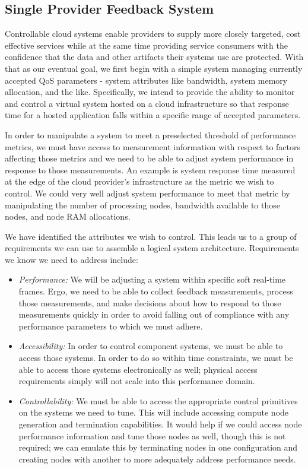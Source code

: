 \documentclass[notitlepage]{book}
\begin{document}
\begin{doublespace}
\subsection{Single Provider Feedback System}\label{sec:single}
Controllable cloud systems enable providers to supply more closely targeted, cost effective services while at the same time providing service consumers with the confidence that the data and other artifacts their systems use are protected.  With that as our eventual goal, we first begin with a simple system managing currently accepted QoS parameters - system attributes like bandwidth, system memory allocation, and the like.  Specifically, we intend to provide the ability to monitor and control a virtual system hosted on a cloud infrastructure so that response time for a hosted application falls within a specific range of accepted parameters.

In order to manipulate a system to meet a preselected threshold of performance metrics, we must have access to measurement information with respect to factors affecting those metrics and we need to be able to adjust system performance in response to those measurements.  An example is system response time measured at the edge of the cloud provider's infrastructure as the metric we wish to control.  We could very well adjust system performance to meet that metric by manipulating the number of processing nodes, bandwidth available to those nodes, and node RAM allocations.

We have identified the attributes we wish to control.  This leads us to a group of requirements we can use to assemble a logical system architecture.  Requirements we know we need to address include:

\begin{itemize}
\item \textit{Performance:} We will be adjusting a system within specific soft real-time frames.  Ergo, we need to be able to collect feedback measurements, process those measurements, and make decisions about how to respond to those measurements quickly in order to avoid falling out of compliance with any performance parameters to which we must adhere.
\item \textit{Accessibility:} In order to control component systems, we must be able to access those systems.  In order to do so within time constraints, we must be able to access those systems electronically as well; physical access requirements simply will not scale into this performance domain.
\item \textit{Controllability:} We must be able to access the appropriate control primitives on the systems we need to tune.  This will include accessing compute node generation and termination capabilities.  It would help if we could access node performance information and tune those nodes as well, though this is not required; we can emulate this by terminating nodes in one configuration and creating nodes with another to more adequately address performance needs.
\end{itemize}


\end{doublespace}
\end{document}
